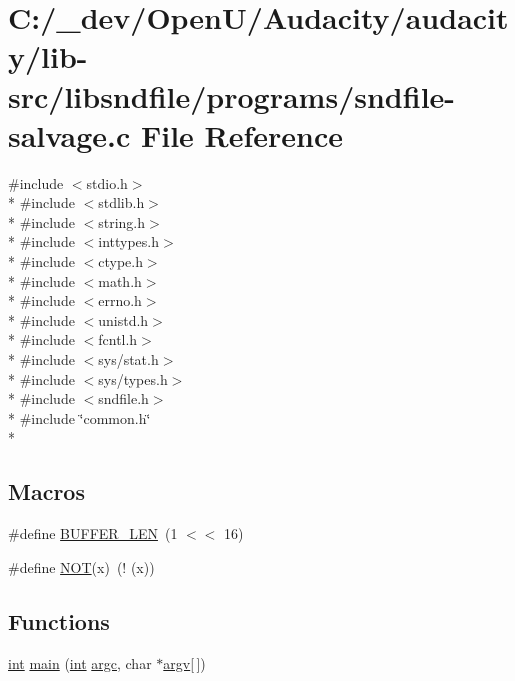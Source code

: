 \hypertarget{sndfile-salvage_8c}{}\section{C\+:/\+\_\+dev/\+Open\+U/\+Audacity/audacity/lib-\/src/libsndfile/programs/sndfile-\/salvage.c File Reference}
\label{sndfile-salvage_8c}
{\ttfamily \#include $<$stdio.\+h$>$}\\*
{\ttfamily \#include $<$stdlib.\+h$>$}\\*
{\ttfamily \#include $<$string.\+h$>$}\\*
{\ttfamily \#include $<$inttypes.\+h$>$}\\*
{\ttfamily \#include $<$ctype.\+h$>$}\\*
{\ttfamily \#include $<$math.\+h$>$}\\*
{\ttfamily \#include $<$errno.\+h$>$}\\*
{\ttfamily \#include $<$unistd.\+h$>$}\\*
{\ttfamily \#include $<$fcntl.\+h$>$}\\*
{\ttfamily \#include $<$sys/stat.\+h$>$}\\*
{\ttfamily \#include $<$sys/types.\+h$>$}\\*
{\ttfamily \#include $<$sndfile.\+h$>$}\\*
{\ttfamily \#include \char`\"{}common.\+h\char`\"{}}\\*
\subsection*{Macros}
\begin{DoxyCompactItemize}
\item 
\#define \hyperlink{sndfile-salvage_8c_a46130dc86f2322714bba26960b64e7bb}{B\+U\+F\+F\+E\+R\+\_\+\+L\+EN}~(1 $<$$<$ 16)
\item 
\#define \hyperlink{sndfile-salvage_8c_a30c984add4da766f18737e88c810055b}{N\+OT}(x)~(! (x))
\end{DoxyCompactItemize}
\subsection*{Functions}
\begin{DoxyCompactItemize}
\item 
\hyperlink{xmltok_8h_a5a0d4a5641ce434f1d23533f2b2e6653}{int} \hyperlink{sndfile-salvage_8c_a0ddf1224851353fc92bfbff6f499fa97}{main} (\hyperlink{xmltok_8h_a5a0d4a5641ce434f1d23533f2b2e6653}{int} \hyperlink{cmdline_8c_aaffeb1bf2056ea44af5b5d0ee4d6ff07}{argc}, char $\ast$\hyperlink{cmdline_8c_ad407d5ba91709bd9b092003858600723}{argv}\mbox{[}$\,$\mbox{]})
\end{DoxyCompactItemize}



